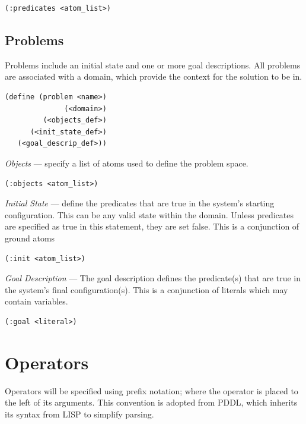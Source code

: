 \documentclass[
a4paper, %
11pt, %
onecolumn, %
openany, %
]{memoir}
\begin{document}
{\begin{lstlisting}
(:predicates <atom_list>)
\end{lstlisting}

\subsection{Problems}
Problems include an initial state and one or more goal descriptions. All problems are associated with a domain, which provide the context for the solution to be in.

\begin{lstlisting}
(define (problem <name>)
              (<domain>)
         (<objects_def>)
      (<init_state_def>)
   (<goal_descrip_def>))
\end{lstlisting}

\textit{Objects} --- specify a list of atoms used to define the problem space.

\begin{lstlisting}
(:objects <atom_list>)
\end{lstlisting}

\textit{Initial State} --- define the predicates that are true in the system's starting configuration. This can be any valid state within the domain. Unless predicates are specified as true in this statement, they are set false. This is a conjunction of ground atoms

\begin{lstlisting}
(:init <atom_list>)
\end{lstlisting}

\textit{Goal Description} --- The goal description defines the predicate(s) that are true in the system's final configuration(s). This is a conjunction of literals which may contain variables.

\begin{lstlisting}
(:goal <literal>)
\end{lstlisting}
}

\section{Operators}
Operators will be specified using prefix notation; where the operator is placed to the left of its arguments. This convention is adopted from PDDL, which inherits its syntax from LISP to simplify parsing.\\
\end{document}
